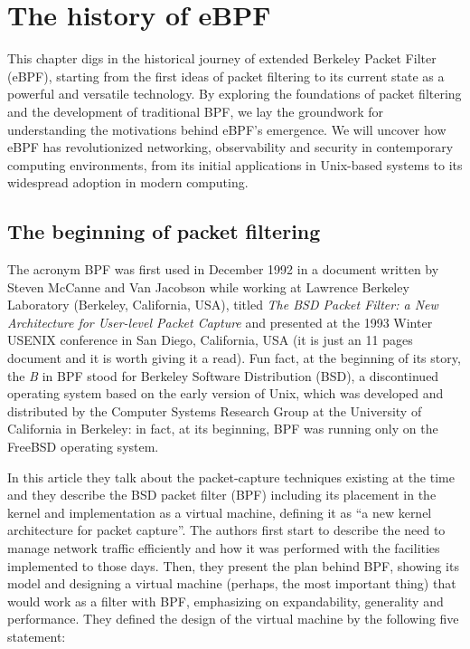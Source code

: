 \chapter{The history of eBPF}

This chapter digs in the historical journey of extended Berkeley Packet Filter (eBPF), starting from the first ideas of packet filtering to its current state as a powerful and versatile technology. 
By exploring the foundations of packet filtering and the development of traditional BPF, we lay the groundwork for understanding the motivations behind eBPF's emergence. 
We will uncover how eBPF has revolutionized networking, observability and security in contemporary computing environments, from its initial applications in Unix-based systems to its widespread adoption in modern computing.

\section{The beginning of packet filtering}

The acronym BPF was first used in December 1992 in a document written by Steven McCanne and Van Jacobson while working at Lawrence Berkeley Laboratory (Berkeley, California, USA), titled \textit{The BSD Packet Filter: a New Architecture for User-level Packet Capture} \cite{BSDPacketFilter} and presented at the 1993 Winter USENIX conference in San Diego, California, USA (it is just an 11 pages document and it is worth giving it a read).
Fun fact, at the beginning of its story, the \textit{B} in BPF stood for Berkeley Software Distribution (BSD), a discontinued operating system based on the early version of Unix, which was developed and distributed by the Computer Systems Research Group at the University of California in Berkeley: in fact, at its beginning, BPF was running only on the FreeBSD operating system.

In this article they talk about the packet-capture techniques existing at the time and they describe the BSD packet filter (BPF) including its placement in the kernel and implementation as a virtual machine, defining it as ``a new kernel architecture for packet capture''.
The authors first start to describe the need to manage network traffic efficiently and how it was performed with the facilities implemented to those days.
Then, they present the plan behind BPF, showing its model and designing a virtual machine (perhaps, the most important thing) that would work as a filter with BPF, emphasizing on expandability, generality and performance.
They defined the design of the virtual machine by the following five statement:

